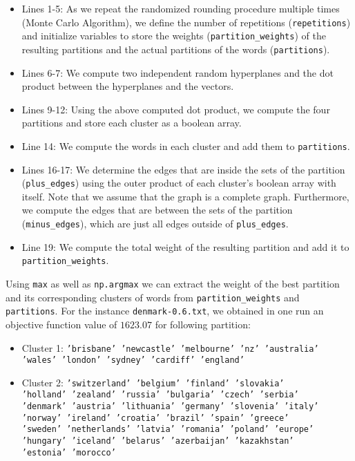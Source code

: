 \documentclass{article}
\begin{document}
\begin{itemize}
    \item Lines 1-5: As we repeat the randomized rounding procedure multiple times (Monte Carlo Algorithm), we define the number of repetitions (\lstinline|repetitions|) and initialize variables to store the weights (\lstinline|partition_weights|) of the resulting partitions and the actual partitions of the words (\lstinline|partitions|).
    \item Lines 6-7: We compute two independent random hyperplanes and the dot product between the hyperplanes and the vectors.
    \item Lines 9-12: Using the above computed dot product, we compute the four partitions and store each cluster as a boolean array.
    \item Line 14: We compute the words in each cluster and add them to \lstinline|partitions|.
    \item Lines 16-17: We determine the edges that are inside the sets of the partition (\lstinline|plus_edges|) using the outer product of each cluster's boolean array with itself. Note that we assume that the graph is a complete graph. Furthermore, we compute the edges that are between the sets of the partition (\lstinline|minus_edges|), which are just all edges outside of \lstinline|plus_edges|.
    \item Line 19: We compute the total weight of the resulting partition and add it to \lstinline|partition_weights|.
\end{itemize}

Using \lstinline|max| as well as \lstinline|np.argmax| we can extract the weight of the best partition and its corresponding clusters of words from \lstinline|partition_weights| and \lstinline|partitions|. For the instance \texttt{denmark-0.6.txt}, we obtained in one run an objective function value of $1623.07$ for following partition:
\begin{itemize}
    \item Cluster 1: \texttt{'brisbane' 'newcastle' 'melbourne' 'nz' 'australia' 'wales' 'london'
 'sydney' 'cardiff' 'england'}
    \item Cluster 2: \texttt{'switzerland' 'belgium' 'finland' 'slovakia' \\'holland' 'zealand' 'russia'
 'bulgaria' 'czech' 'serbia' \\'denmark' 'austria' 'lithuania' 'germany'
 'slovenia' 'italy' \\'norway' 'ireland' 'croatia' 'brazil' 'spain' 'greece'
 \\'sweden' 'netherlands' 'latvia' 'romania' 'poland' 'europe' \\'hungary'
 'iceland' 'belarus' 'azerbaijan' 'kazakhstan' \\'estonia' 'morocco'}
\end{itemize}
\end{document}
